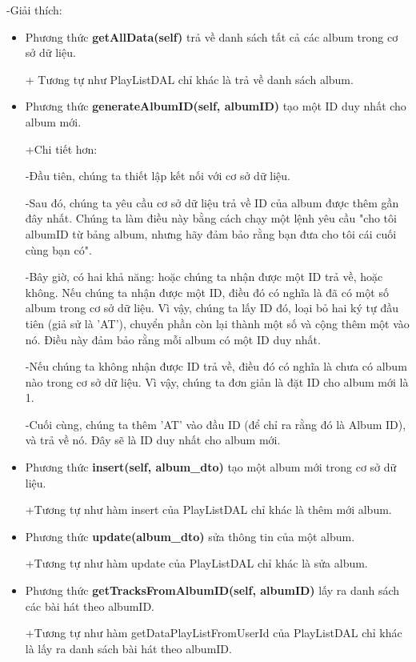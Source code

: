 \documentclass[a4paper]{article}
\begin{document}
\begin{flushleft}
	-Giải thích:
	\begin{itemize}
		\item Phương thức \textbf{getAllData(self)} trả về danh sách tất cả các album trong cơ sở dữ liệu.
		      \begin{flushleft}
			      + Tương tự như PlayListDAL chỉ khác là trả về danh sách album.
		      \end{flushleft}
		\item Phương thức \textbf{generateAlbumID(self, albumID)} tạo một ID duy nhất cho album mới.
		      \begin{flushleft}
			      +Chi tiết hơn:

			      -Đầu tiên, chúng ta thiết lập kết nối với cơ sở dữ liệu.

			      -Sau đó, chúng ta yêu cầu cơ sở dữ liệu trả về ID của album được thêm gần đây nhất. Chúng ta làm điều này bằng cách chạy một lệnh yêu cầu "cho tôi albumID từ bảng album, nhưng hãy đảm bảo rằng bạn đưa cho tôi cái cuối cùng bạn có".

			      -Bây giờ, có hai khả năng: hoặc chúng ta nhận được một ID trả về, hoặc không. Nếu chúng ta nhận được một ID, điều đó có nghĩa là đã có một số album trong cơ sở dữ liệu. Vì vậy, chúng ta lấy ID đó, loại bỏ hai ký tự đầu tiên (giả sử là 'AT'), chuyển phần còn lại thành một số và cộng thêm một vào nó. Điều này đảm bảo rằng mỗi album có một ID duy nhất.

			      -Nếu chúng ta không nhận được ID trả về, điều đó có nghĩa là chưa có album nào trong cơ sở dữ liệu. Vì vậy, chúng ta đơn giản là đặt ID cho album mới là 1.

			      -Cuối cùng, chúng ta thêm 'AT' vào đầu ID (để chỉ ra rằng đó là Album ID), và trả về nó. Đây sẽ là ID duy nhất cho album mới.
		      \end{flushleft}
		\item Phương thức \textbf{insert(self, album\_dto)} tạo một album mới trong cơ sở dữ liệu.
		      \begin{flushleft}
			      +Tương tự như hàm insert của PlayListDAL chỉ khác là thêm mới album.
		      \end{flushleft}
		\item Phương thức \textbf{update(album\_dto)} sửa thông tin của một album.
		      \begin{flushleft}
			      +Tương tự như hàm update của PlayListDAL chỉ khác là sửa album.
		      \end{flushleft}
		\item Phương thức \textbf{getTracksFromAlbumID(self, albumID)} lấy ra danh sách các bài hát theo albumID.
		      \begin{flushleft}
			      +Tương tự như hàm getDataPlayListFromUserId của PlayListDAL chỉ khác là lấy ra danh sách bài hát theo albumID.
		      \end{flushleft}
	\end{itemize}
\end{flushleft}
\clearpage
\end{document}
